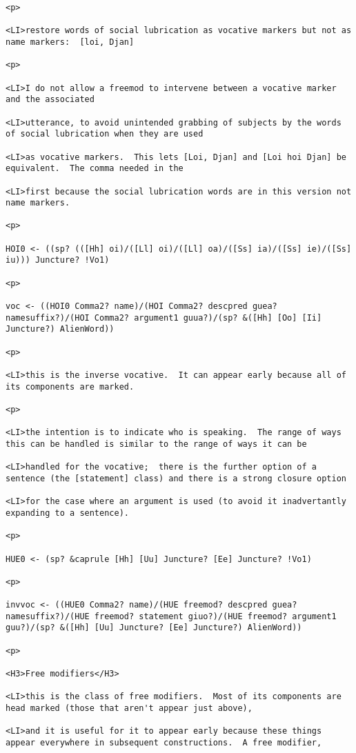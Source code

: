 \documentclass[12pt]{article}
\begin{document}
\begin{lstlisting}
<p>

<LI>restore words of social lubrication as vocative markers but not as name markers:  [loi, Djan]

<p>

<LI>I do not allow a freemod to intervene between a vocative marker and the associated

<LI>utterance, to avoid unintended grabbing of subjects by the words of social lubrication when they are used

<LI>as vocative markers.  This lets [Loi, Djan] and [Loi hoi Djan] be equivalent.  The comma needed in the

<LI>first because the social lubrication words are in this version not name markers.

<p>

HOI0 <- ((sp? (([Hh] oi)/([Ll] oi)/([Ll] oa)/([Ss] ia)/([Ss] ie)/([Ss] iu))) Juncture? !Vo1)

<p>

voc <- ((HOI0 Comma2? name)/(HOI Comma2? descpred guea? namesuffix?)/(HOI Comma2? argument1 guua?)/(sp? &([Hh] [Oo] [Ii] Juncture?) AlienWord))

<p>

<LI>this is the inverse vocative.  It can appear early because all of its components are marked.

<p>

<LI>the intention is to indicate who is speaking.  The range of ways this can be handled is similar to the range of ways it can be

<LI>handled for the vocative;  there is the further option of a sentence (the [statement] class) and there is a strong closure option

<LI>for the case where an argument is used (to avoid it inadvertantly expanding to a sentence).

<p>

HUE0 <- (sp? &caprule [Hh] [Uu] Juncture? [Ee] Juncture? !Vo1)

<p>

invvoc <- ((HUE0 Comma2? name)/(HUE freemod? descpred guea? namesuffix?)/(HUE freemod? statement giuo?)/(HUE freemod? argument1 guu?)/(sp? &([Hh] [Uu] Juncture? [Ee] Juncture?) AlienWord))

<p>

<H3>Free modifiers</H3>

<LI>this is the class of free modifiers.  Most of its components are head marked (those that aren't appear just above),

<LI>and it is useful for it to appear early because these things appear everywhere in subsequent constructions.  A free modifier,


\end{lstlisting}
\end{document}
